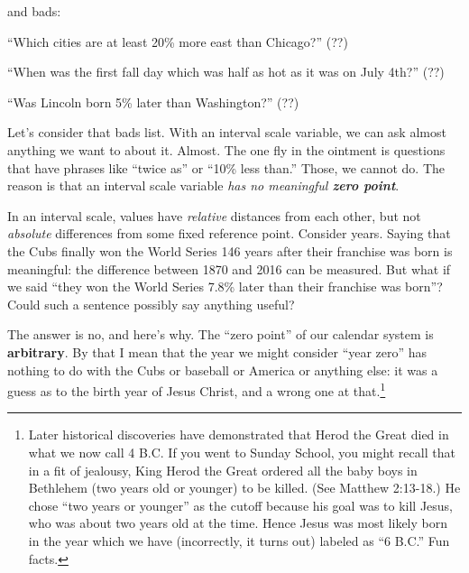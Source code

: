 and bads:

\begin{compactitem}
\item[\leftthumbsdown] ``Which cities are at least 20\% more east than
Chicago?'' (??)
\item[\leftthumbsdown] ``When was the first fall day which was half as hot as
it was on July 4th?'' (??)
\item[\leftthumbsdown] ``Was Lincoln born 5\% later than Washington?'' (??)
\end{compactitem}

Let's consider that bads list. With an interval scale variable, we can ask
almost anything we want to about it. Almost. The one fly in the ointment is
questions that have phrases like ``twice as'' or ``10\% less than.'' Those, we
cannot do. The reason is that an interval scale variable \textit{has no
meaningful \textbf{zero point}}.

In an interval scale, values have \textit{relative} distances from each other,
but not \textit{absolute} differences from some fixed reference point. Consider
years. Saying that the Cubs finally won the World Series 146 years after their
franchise was born is meaningful: the difference between 1870 and 2016 can be
measured. But what if we said ``they won the World Series 7.8\% later than
their franchise was born''? Could such a sentence possibly say anything useful?

The answer is no, and here's why. The ``zero point'' of our calendar system is
\textbf{arbitrary}. By that I mean that the year we might consider ``year
zero'' has nothing to do with the Cubs or baseball or America or anything else:
it was a guess as to the birth year of Jesus Christ, and a wrong one at
that.\footnote{Later historical discoveries have demonstrated that Herod the
Great died in what we now call 4 B.C. If you went to Sunday School, you might
recall that in a fit of jealousy, King Herod the Great ordered all the baby
boys in Bethlehem (two years old or younger) to be killed. (See Matthew
2:13-18.) He chose ``two years or younger'' as the cutoff because his goal was
to kill Jesus, who was about two years old at the time. Hence Jesus was most
likely born in the year which we have (incorrectly, it turns out) labeled as
``6 B.C.'' Fun facts.}


